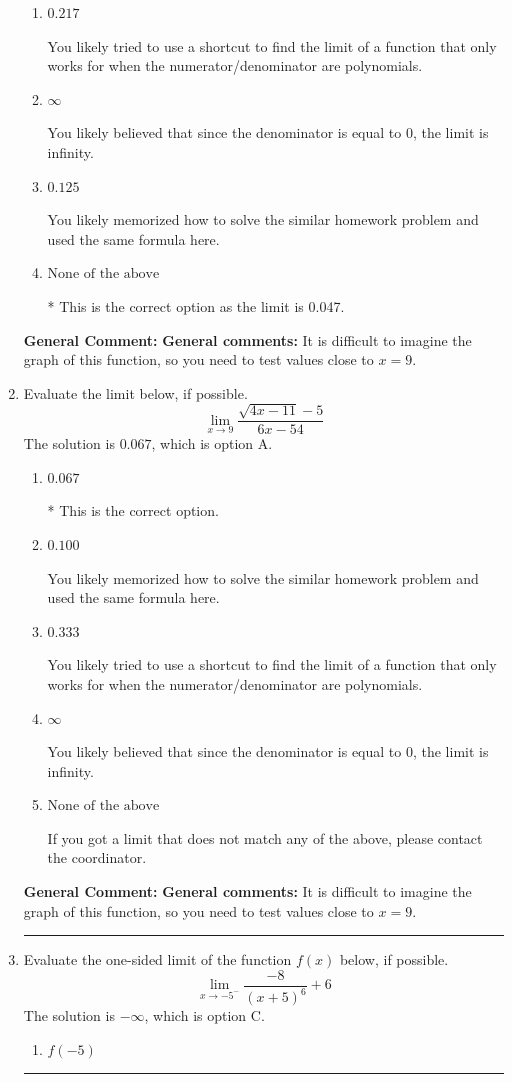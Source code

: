 \documentclass{extbook}[14pt]
\newcommand{\litem}[1]{\item #1

\rule{\textwidth}{0.4pt}}
\begin{document}
\begin{enumerate}
{\begin{enumerate}[label=\Alph*.]
You likely learned L'Hospital's Rule in a previous course, but misapplied it here.
\item \( 0.217 \)

You likely tried to use a shortcut to find the limit of a function that only works for when the numerator/denominator are polynomials.
\item \( \infty \)

You likely believed that since the denominator is equal to 0, the limit is infinity.
\item \( 0.125 \)

You likely memorized how to solve the similar homework problem and used the same formula here.
\item \( \text{None of the above} \)

* This is the correct option as the limit is 0.047.
\end{enumerate}

\textbf{General Comment:} \textbf{General comments:} It is difficult to imagine the graph of this function, so you need to test values close to $x = 9$.
}
\litem{
Evaluate the limit below, if possible.
\[ \lim_{x \rightarrow 9} \frac{\sqrt{4x - 11} - 5}{6x - 54} \]The solution is \( 0.067 \), which is option A.\begin{enumerate}[label=\Alph*.]
\item \( 0.067 \)

* This is the correct option.
\item \( 0.100 \)

You likely memorized how to solve the similar homework problem and used the same formula here.
\item \( 0.333 \)

You likely tried to use a shortcut to find the limit of a function that only works for when the numerator/denominator are polynomials.
\item \( \infty \)

You likely believed that since the denominator is equal to 0, the limit is infinity.
\item \( \text{None of the above} \)

If you got a limit that does not match any of the above, please contact the coordinator.
\end{enumerate}

\textbf{General Comment:} \textbf{General comments:} It is difficult to imagine the graph of this function, so you need to test values close to $x = 9$.
}
\litem{
Evaluate the one-sided limit of the function $f(x)$ below, if possible.
\[ \lim_{x \rightarrow -5^-} \frac{-8}{(x+5)^6}+6 \]The solution is \( -\infty \), which is option C.\begin{enumerate}[label=\Alph*.]
\item \( f(-5) \)



\end{enumerate}}
\end{enumerate}
\end{document}
